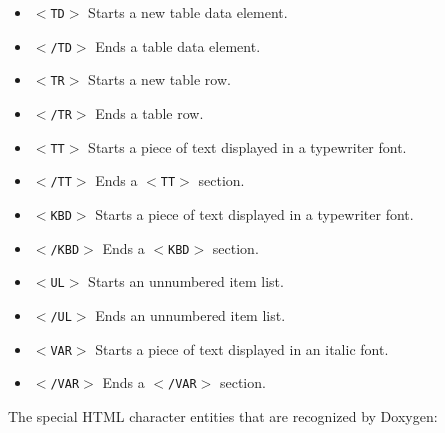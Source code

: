 \begin{itemize}
{\tt $<$/TABLE$>$} ends a table. \item {\tt $<$TD$>$} Starts a new table data element. \item {\tt $<$/TD$>$} Ends a table data element. \item {\tt $<$TR$>$} Starts a new table row. \item {\tt $<$/TR$>$} Ends a table row. \item {\tt $<$TT$>$} Starts a piece of text displayed in a typewriter font. \item {\tt $<$/TT$>$} Ends a {\tt $<$TT$>$} section. \item {\tt $<$KBD$>$} Starts a piece of text displayed in a typewriter font. \item {\tt $<$/KBD$>$} Ends a {\tt $<$KBD$>$} section. \item {\tt $<$UL$>$} Starts an unnumbered item list. \item {\tt $<$/UL$>$} Ends an unnumbered item list. \item {\tt $<$VAR$>$} Starts a piece of text displayed in an italic font. \item {\tt $<$/VAR$>$} Ends a {\tt $<$/VAR$>$} section. \end{itemize}


The special HTML character entities that are recognized by Doxygen:

